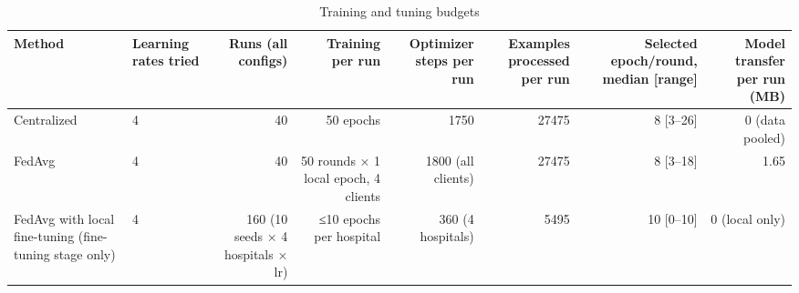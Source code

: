 \begin{table}[ht]
\centering
\small
\caption{Training and tuning budgets}
\label{tab:table5_training_budget}
\begin{tabular}{llrrrrrr}
\toprule
Method & Learning rates tried & Runs (all configs) & Training per run & Optimizer steps per run & Examples processed per run & Selected epoch/round, median [range] & Model transfer per run (MB) \\
\midrule
Centralized & 4 & 40 & 50 epochs & 1750 & 27475 & 8 [3–26] & 0 (data pooled) \\
FedAvg & 4 & 40 & 50 rounds × 1 local epoch, 4 clients & 1800 (all clients) & 27475 & 8 [3–18] & 1.65 \\
FedAvg with local fine-tuning (fine-tuning stage only) & 4 & 160 (10 seeds × 4 hospitals × lr) & ≤10 epochs per hospital & 360 (4 hospitals) & 5495 & 10 [0–10] & 0 (local only) \\
\bottomrule
\end{tabular}
\end{table}
